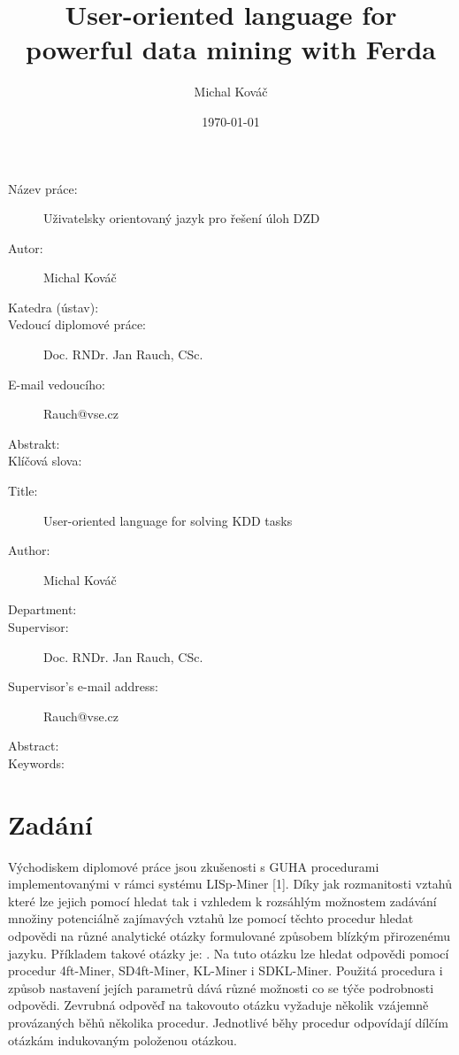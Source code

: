 \documentclass[a4paper,12pt]{book}
\author{Michal Kováč}
\title{User-oriented language for powerful data mining with Ferda}
\date{\today}
\begin{document}
\maketitle

\begin{description}
 \item [Název práce:] Uživatelsky orientovaný jazyk pro řešení úloh DZD
 \item [Autor:] Michal Kováč
 \item [Katedra (ústav):]
 \item [Vedoucí diplomové práce:] Doc. RNDr. Jan Rauch, CSc.
 \item [E-mail vedoucího:] Rauch@vse.cz
 \item [Abstrakt:]
 \item [Klíčová slova:]
\end{description}

\medskip

\begin{description}
 \item [Title:] User-oriented language for solving KDD tasks
 \item [Author:] Michal Kováč
 \item [Department:]
 \item [Supervisor:] Doc. RNDr. Jan Rauch, CSc.
 \item [Supervisor's e-mail address:] Rauch@vse.cz
 \item [Abstract:]
 \item [Keywords:]
\end{description}
\newpage

\tableofcontents

\section*{Zadání}
Východiskem diplomové práce jsou zkušenosti s GUHA procedurami implementovanými v rámci systému LISp-Miner [1]. Díky jak rozmanitosti vztahů které lze jejich pomocí hledat tak i vzhledem k rozsáhlým možnostem zadávání množiny potenciálně zajímavých vztahů lze pomocí těchto procedur hledat odpovědi na různé analytické otázky formulované způsobem blízkým přirozenému jazyku. Příkladem takové otázky je: . Na tuto otázku lze hledat odpovědi pomocí procedur 4ft-Miner, SD4ft-Miner, KL-Miner i SDKL-Miner. Použitá procedura i způsob nastavení jejích parametrů dává různé možnosti co se týče podrobnosti odpovědi. Zevrubná odpověď na takovouto otázku vyžaduje několik vzájemně provázaných běhů několika procedur. Jednotlivé běhy procedur odpovídají dílčím otázkám indukovaným položenou otázkou.
\end{document}
